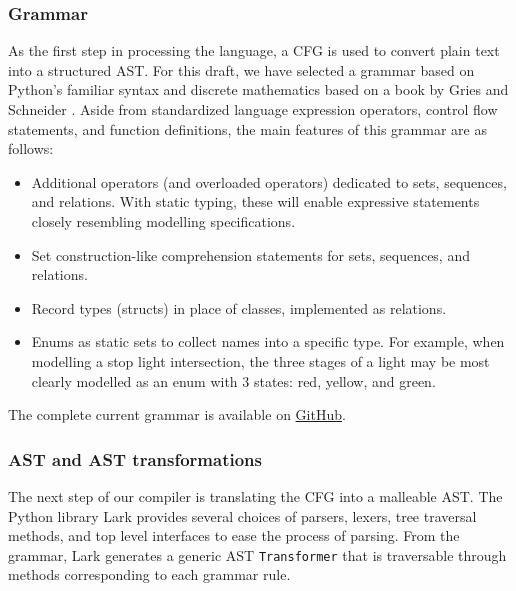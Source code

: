 \documentclass{article}
\begin{document}
\subsubsection{Grammar}

As the first step in processing the language, a CFG is used to convert plain text into a structured AST. For this draft, we have selected a grammar based on Python's familiar syntax \cite{pythonGrammar} and discrete mathematics based on a book by Gries and Schneider \cite{griesAndSchneider}. Aside from standardized language expression operators, control flow statements, and function definitions, the main features of this grammar are as follows:
\begin{itemize}
  \item Additional operators (and overloaded operators) dedicated to sets, sequences, and relations. With static typing, these will enable expressive statements closely resembling modelling specifications.
  \item Set construction-like comprehension statements for sets, sequences, and relations.
  \item Record types (structs) in place of classes, implemented as relations.
  \item Enums as static sets to collect names into a specific type. For example, when modelling a stop light intersection, the three stages of a light may be most clearly modelled as an enum with 3 states: red, yellow, and green.
\end{itemize}

The complete current grammar is available on \href{https://github.com/Ant13731/compilers/blob/main/implementation/grammar.lark}{GitHub}.

\subsubsection{AST and AST transformations}

The next step of our compiler is translating the CFG into a malleable AST. The Python library Lark \cite{lark} provides several choices of parsers, lexers, tree traversal methods, and top level interfaces to ease the process of parsing. From the grammar, Lark generates a generic AST \texttt{Transformer} that is traversable through methods corresponding to each grammar rule.
\end{document}
